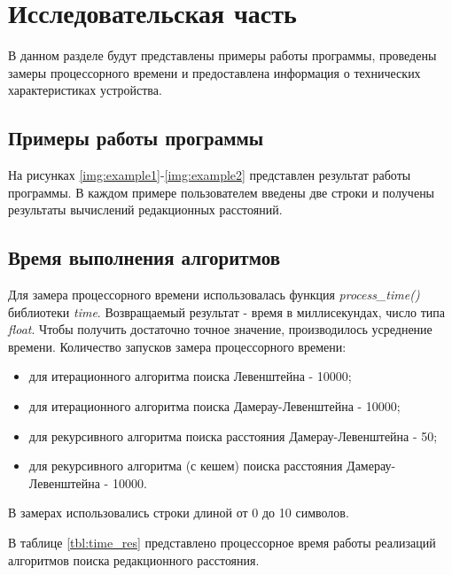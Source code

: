 \chapter{Исследовательская часть}

В данном разделе будут представлены примеры работы программы, проведены замеры процессорного времени и предоставлена информация о технических характеристиках устройства.

\section{Примеры работы программы}

На рисунках \ref{img:example1}-\ref{img:example2} представлен результат работы программы. В каждом примере пользователем введены две строки и получены результаты вычислений редакционных расстояний.

\clearpage


\section{Время выполнения алгоритмов}

Для замера процессорного времени использовалась функция \textit{process\_time()} библиотеки \textit{time}. Возвращаемый результат - время в миллисекундах, число типа \textit{float}.
Чтобы получить достаточно точное значение, производилось усреднение времени.
Количество запусков замера процессорного времени:
\begin{itemize}
    \item для итерационного алгоритма поиска Левенштейна - 10000;
    \item для итерационного алгоритма поиска Дамерау-Левенштейна - 10000;
    \item для рекурсивного алгоритма поиска расстояния Дамерау-Левенштейна - 50;
    \item для рекурсивного алгоритма (с кешем) поиска расстояния Дамерау-Левенштейна - 10000.
\end{itemize}

В замерах использовались строки длиной от 0 до 10 символов.

В таблице \ref{tbl:time_res} представлено процессорное время работы реализаций алгоритмов поиска редакционного расстояния.

